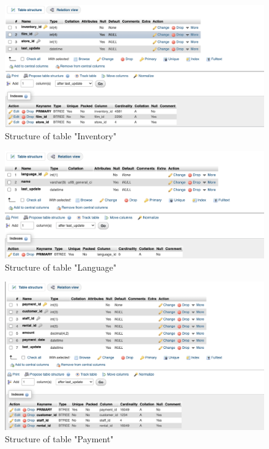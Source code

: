 \documentclass[openany]{article}
\begin{document}
	\begin{figure}[H]
		\includegraphics[width=\textwidth]{table_inventory_struct}
		\caption{Structure of table "Inventory"}	
	\end{figure}
	\begin{figure}[H]
		\includegraphics[width=\textwidth]{table_language_struct}
		\caption{Structure of table "Language"}	
	\end{figure}
	\begin{figure}[H]
		\includegraphics[width=\textwidth]{table_payment_struct}
		\caption{Structure of table "Payment"}	
	\end{figure}
\end{document}
